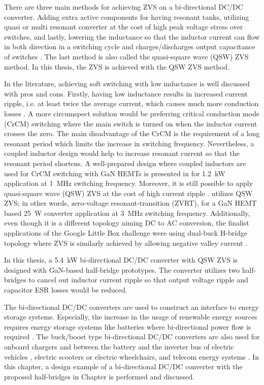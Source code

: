 \documentclass[energies,article,submit,moreauthors,pdftex]{Definitions/mdpi}
\begin{document}
There are three main methods for achieving ZVS on a bi-directional DC/DC converter. Adding extra active components for having resonant tanks, utilizing quasi or multi resonant converter at the cost of high peak voltage stress over switches, and lastly, lowering the inductance so that the inductor current can flow in both direction in a switching cycle and charges/discharges output capacitance of switches \cite{Das2010}. The last method is also called the quasi-square wave (QSW) ZVS method. In this thesis, the ZVS is achieved with the QSW ZVS method.

In the literature, achieving soft switching with low inductance is well discussed with pros and cons. Firstly, having low inductance results in increased current ripple, i.e. at least twice the average current, which causes much more conduction losses \cite{Das2010,Huang2016b,Chen2016,Lee2015}. A more circumspect solution would be preferring critical conduction mode (CrCM) switching where the main switch is turned on when the inductor current crosses the zero. The main disadvantage of the CrCM is the requirement of a long resonant period which limits the increase in switching frequency. Nevertheless, a coupled inductor design would help to increase resonant current so that the resonant period shortens. A well-prepared design where coupled inductors are used for CrCM switching with GaN HEMTs is presented in \cite{Huang2016b} for 1.2~kW application at 1~MHz switching frequency. Moreover, it is still possible to apply quasi-square wave (QSW) ZVS at the cost of high current ripple \cite{Mao2008}. \cite{Lee2015} utilizes QSW ZVS; in other words, zero-voltage resonant-transition (ZVRT), for a GaN HEMT based 25~W converter application at 3~MHz switching frequency. Additionally, even though it is a different topology aiming DC to AC conversion, the finalist applications of the Google Little Box challenge were using dual-buck H-bridge topology where ZVS is similarly achieved by allowing negative valley current \cite{Huang2019}.

In this thesis, a 5.4~kW bi-directional DC/DC converter with QSW ZVS is designed with GaN-based half-bridge prototypes. The converter utilizes two half-bridges to cancel out inductor current ripple so that output voltage ripple and capacitor ESR losses \cite{Lee2015} would be reduced.

The bi-directional DC/DC converters are used to construct an interface to energy storage systems. Especially, the increase in the usage of renewable energy sources requires energy storage systems like batteries where bi-directional power flow is required \cite{Yang2014}. The buck/boost type bi-directional DC/DC converters are also used for onboard chargers and between the battery and the inverter bus of electric vehicles \cite{Huang2016b, Khan2015}, electric scooters or electric wheelchairs, and telecom energy systems \cite{Lee2006}. In this chapter, a design example of a bi-directional DC/DC converter with the proposed half-bridges in Chapter is performed and discussed.
\end{document}

